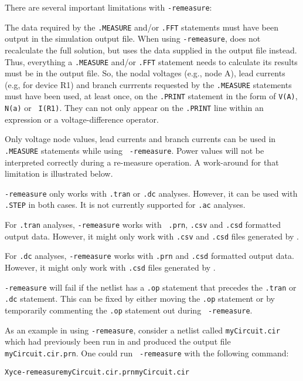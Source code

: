 There are several important limitations with {\tt -remeasure}:
\begin{XyceItemize}

  \item The data required by the {\tt .MEASURE} and/or {\tt .FFT} statements
   must have been output in the simulation output file.  When using
  {\tt -remeasure}, \Xyce{} does not recalculate the full solution, but
  uses the data supplied in the output file instead.  Thus, everything
  a {\tt .MEASURE} and/or {\tt .FFT} statement needs to calculate its results
  must be in the output file.  So, the nodal voltages (e.g., node A), lead
  currents (e.g, for device R1) and branch currrents requested by the
  {\tt .MEASURE} statements must have been used, at least once, on the
  {\tt .PRINT} statement in the form of {\tt V(A)}, {\tt N(a)} or {\tt
  I(R1)}.  They can not only appear on the {\tt .PRINT} line within an
  expression or a voltage-difference operator.

  \item Only voltage node values, lead currents and branch currents
  can be used in {\tt .MEASURE} statements while using {\tt
  -remeasure}.  Power values will not be interpreted correctly during
  a re-measure operation.  A work-around for that limitation is
  illustrated below.

  \item {\tt -remeasure} only works with {\tt .tran} or {\tt .dc}
  analyses.  However, it can be used with {\tt .STEP} in both
  cases. It is not currently supported for {\tt .ac} analyses.

  \item For {\tt .tran} analyses, {\tt -remeasure} works with {\tt
  .prn}, {\tt .csv} and {\tt .csd} formatted output data.  However, it
  might only work with {\tt .csv} and {\tt .csd} files generated
  by \Xyce{}.  \item For {\tt .dc} analyses, {\tt -remeasure} works
  with {\tt .prn} and {\tt .csd} formatted output data.  However, it
  might only work with {\tt .csd} files generated by \Xyce{}.

  \item {\tt -remeasure} will fail if the netlist has a {\tt .op}
  statement that precedes the {\tt .tran} or {\tt .dc} statement.
  This can be fixed by either moving the {\tt .op} statement or by
  temporarily commenting the {\tt .op} statement out during {\tt
  -remeasure}.
\end{XyceItemize}

As an example in using {\tt -remeasure}, consider a netlist called
{\tt myCircuit.cir} which had previously been run in \Xyce{} and
produced the output file {\tt myCircuit.cir.prn}.  One could run {\tt
-remeasure} with the following command:
\begin{alltt}
Xyce -remeasure myCircuit.cir.prn myCircuit.cir
\end{alltt}

